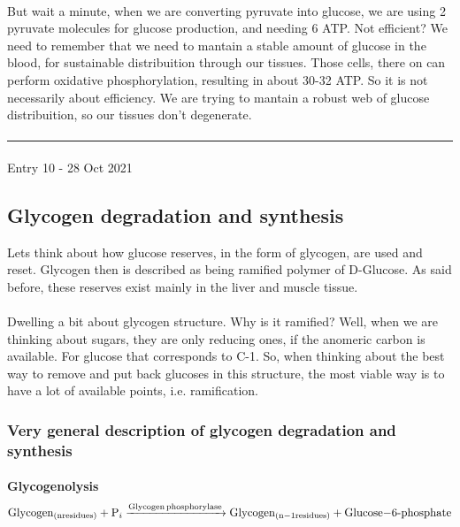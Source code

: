 \documentclass[12pt,  letterpaper]{article}
\begin{document}
\paragraph*{}
But wait a minute, when we are converting pyruvate into glucose, we are using 2 pyruvate molecules for glucose production, and needing 6 ATP. Not efficient? We need to remember that we need to mantain a stable amount of glucose in the blood, for sustainable distribuition through our tissues. Those cells, there on can perform oxidative phosphorylation, resulting in about 30-32 ATP. So it is not necessarily about efficiency. We are trying to mantain a robust web of glucose distribuition, so our tissues don't degenerate.
\paragraph*{}
\hrule
\paragraph*{}
Entry 10 - 28 Oct 2021
\subsection*{Glycogen degradation and synthesis}
Lets think about how glucose reserves, in the form of glycogen, are used and reset. Glycogen then is described as being ramified polymer of D-Glucose. As said before, these reserves exist mainly in the liver and muscle tissue.
\paragraph*{}
Dwelling a bit about glycogen structure. Why is it ramified? Well, when we are thinking about sugars, they are only reducing ones, if the anomeric carbon is available. For glucose that corresponds to C-1. So, when thinking about the best way to remove and put back glucoses in this structure, the most viable way is to have a lot of available points, i.e. ramification.
\subsubsection*{Very general description of glycogen degradation and synthesis}
\paragraph*{}
\textbf{Glycogenolysis}
\begin{equation}
\ce{Glycogen_{(n\,residues)} + P_{i} ->[Glycogen phosphorylase] Glycogen_{(n-1\,residues)} + Glucose-6-phosphate}
\end{equation}
\end{document}

